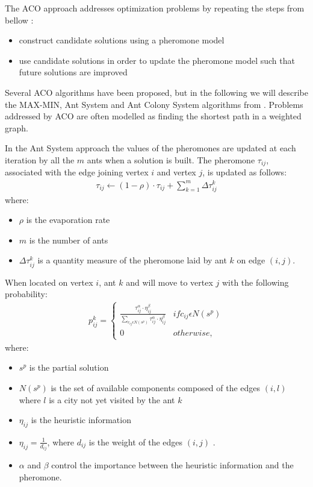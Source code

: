 The ACO approach addresses optimization problems by repeating the  steps from bellow \cite{Dorigo05Ant}:
\begin{itemize}
\item construct candidate solutions using a pheromone model
\item use candidate solutions in order to update the pheromone model such that future solutions are improved
\end{itemize}

Several ACO algorithms have been proposed, but in the following we will describe the MAX-MIN, Ant System and Ant Colony System algorithms from \cite{Dorigo07Ant}. Problems addressed by ACO are often modelled as finding the shortest path in a weighted graph.

In the Ant System approach the values of the pheromones  are updated at each iteration by all the $m$ ants when a solution is built. The pheromone $\tau_{ij}$, associated with the edge joining vertex $i$ and  vertex $j$, is updated as follows:
\begin{align}
\tau_{ij} \leftarrow (1-\rho) \cdot \tau_{ij} + \sum_{k=1}^{m}\Delta \tau_{ij}^{k}
\end{align}
where:
\begin{itemize}
\item  $\rho$ is the evaporation rate 
\item $m$ is the number of ants
\item  $\Delta \tau_{ij}^{k}$ is a quantity measure of the pheromone laid by ant $k$ on edge $(i, j)$.
\end{itemize}


When located on vertex $i$, ant $k$ and will move to vertex $j$ with the following probability:
\begin{align}
p_{ij}^{k} = \left\{
	\begin{array}{ll}
		\frac{\tau_{ij}^{\alpha} \cdot \eta_{ij}^{\beta}}{ \sum_{c_{ij} \epsilon N(s^{p})}^{} \tau_{ij}^{\alpha} \cdot \eta_{ij}^{\beta}} & if c_{ij} \epsilon N(s^{p})\\
		0 & otherwise,
	\end{array}
\right.
\end{align}
where:
\begin{itemize}
\item $s^{p}$ is the partial solution 
\item $N(s^{p})$ is the set of available components composed of  the edges $(i, l)$ where $l$ is a city not yet visited by the ant $k$
\item $\eta_{ij}$ is the heuristic information
\item $\eta_{ij} = \frac{1}{d_{ij}}$, where $d_{ij}$ is the weight of the edges $(i, j)$ .
\item $\alpha$ and $\beta$ control the importance between the heuristic information and the pheromone. 
\end{itemize}

